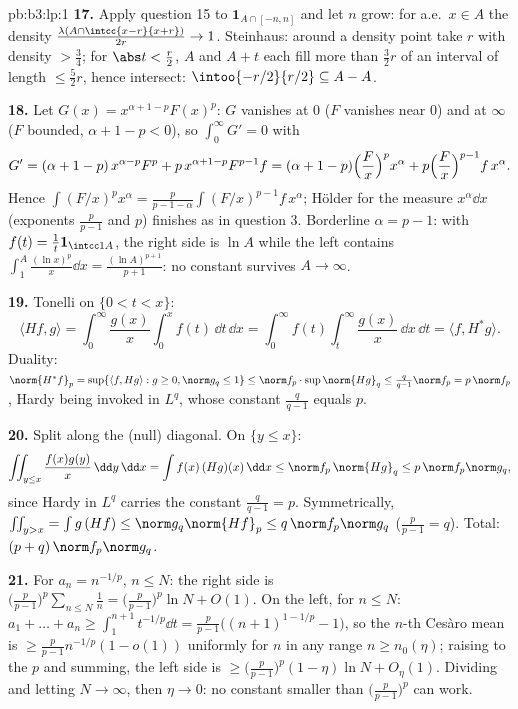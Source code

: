 \begin{solution}{pb:b3:lp:1}
\textbf{17.} Apply question 15 to $\mathbf 1_{A\cap[-n,n]}$
and let $n$ grow: for a.e.\ $x \in A$ the density
$\frac{\lambda(A\cap\intcc{x-r}{x+r})}{2r} \to 1$. Steinhaus:
around a density point take $r$ with density $> \frac34$;
for $\abs t < \frac r2$, $A$ and $A + t$ each fill more than
$\frac32r$ of an interval of length $\leq \frac52r$, hence
intersect: $\intoo{-r/2}{r/2} \subseteq A - A$.

\textbf{18.} Let $G(x) = x^{\alpha+1-p}F(x)^p$: $G$ vanishes
at $0$ ($F$ vanishes near $0$) and at $\infty$ ($F$ bounded,
$\alpha + 1 - p < 0$), so $\int_0^\infty G' = 0$ with
\[
G' = (\alpha + 1 - p)\,x^{\alpha-p}F^p +
p\,x^{\alpha+1-p}F^{p-1}f
= (\alpha + 1 - p)\Bigl(\frac Fx\Bigr)^px^\alpha +
p\Bigl(\frac Fx\Bigr)^{p-1}f\,x^\alpha .
\]
Hence $\int(F/x)^px^\alpha = \frac{p}{p-1-\alpha}
\int(F/x)^{p-1}f\,x^\alpha$; H\"older for the measure
$x^\alpha\dd x$ (exponents $\frac p{p-1}$ and $p$) finishes
as in question 3. Borderline $\alpha = p - 1$: with $f(t) =
\frac1t\mathbf 1_{\intcc1A}$, the right side is $\ln A$
while the left contains $\int_1^A\frac{(\ln x)^p}x\dd x =
\frac{(\ln A)^{p+1}}{p+1}$: no constant survives $A \to
\infty$.

\textbf{19.} Tonelli on $\{0 < t < x\}$:
\[
\langle Hf, g\rangle =
\int_0^\infty\frac{g(x)}x\int_0^xf(t)\,\dd t\,\dd x
= \int_0^\infty f(t)\int_t^\infty\frac{g(x)}x\,\dd x\,\dd t
= \langle f, H^*g\rangle .
\]
Duality: $\norm{H^*f}_p = \sup\{\langle f, Hg\rangle : g
\geq 0, \norm g_q \leq 1\} \leq \norm f_p\cdot
\sup\norm{Hg}_q \leq \frac q{q-1}\norm f_p = p\,\norm f_p$,
Hardy being invoked in $L^q$, whose constant $\frac q{q-1}$
equals $p$.

\textbf{20.} Split along the (null) diagonal. On $\{y \leq
x\}$:
\[
\iint_{y\leq x}\frac{f(x)g(y)}{x}\,\dd y\,\dd x
= \int f(x)\,(Hg)(x)\,\dd x \leq \norm f_p\,\norm{Hg}_q
\leq p\,\norm f_p\norm g_q,
\]
since Hardy in $L^q$ carries the constant $\frac q{q-1} =
p$. Symmetrically, $\iint_{y>x} = \int g\,(Hf) \leq
\norm g_q\norm{Hf}_p \leq q\,\norm f_p\norm g_q$ ($\frac
p{p-1} = q$). Total: $(p + q)\,\norm f_p\norm g_q$.

\textbf{21.} For $a_n = n^{-1/p}$, $n \leq N$: the right
side is $\bigl(\frac p{p-1}\bigr)^p\sum_{n\leq N}\frac1n =
\bigl(\frac p{p-1}\bigr)^p\ln N + O(1)$. On the left, for $n
\leq N$: $a_1 + \dots + a_n \geq \int_1^{n+1}t^{-1/p}\dd t =
\frac{p}{p-1}\bigl((n+1)^{1-1/p} - 1\bigr)$, so the $n$-th
Ces\`aro mean is $\geq \frac p{p-1}n^{-1/p}(1 -
o(1))$ uniformly for $n$ in any range $n \geq n_0(\eta)$;
raising to the $p$ and summing, the left side is $\geq
\bigl(\frac p{p-1}\bigr)^p(1 - \eta)\ln N + O_\eta(1)$.
Dividing and letting $N \to \infty$, then $\eta \to 0$: no
constant smaller than $\bigl(\frac p{p-1}\bigr)^p$ can work.


\end{solution}
